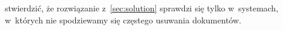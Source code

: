 \begin{enumerate}
stwierdzić, że rozwiązanie z~\ref{sec:solution} sprawdzi się tylko w~systemach, w~których nie spodziewamy się częstego usuwania dokumentów.
\end{enumerate}
